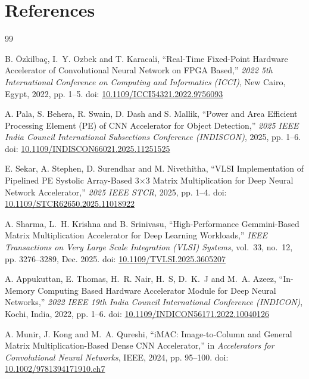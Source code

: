 \documentclass{article}
\begin{document}
\section*{References}

\begin{thebibliography}{99}


B. {\"O}zkilba{\c{c}}, I.~Y. Ozbek and T. Karacali,
``Real-Time Fixed-Point Hardware Accelerator of Convolutional Neural Network
on FPGA Based,''
\textit{2022 5th International Conference on Computing and Informatics (ICCI)},
New Cairo, Egypt, 2022, pp. 1--5.
doi: \href{https://doi.org/10.1109/ICCI54321.2022.9756093}
{10.1109/ICCI54321.2022.9756093}

A. Pala, S. Behera, R. Swain, D. Dash and S. Mallik,
``Power and Area Efficient Processing Element (PE) of CNN Accelerator
for Object Detection,''
\textit{2025 IEEE India Council International Subsections Conference (INDISCON)},
2025, pp. 1--6.
doi: \href{https://doi.org/10.1109/INDISCON66021.2025.11251525}
{10.1109/INDISCON66021.2025.11251525}

E. Sekar, A. Stephen, D. Surendhar and M. Nivethitha,
``VLSI Implementation of Pipelined PE Systolic Array-Based 3$\times$3 Matrix
Multiplication for Deep Neural Network Accelerator,''
\textit{2025 IEEE STCR}, 2025, pp. 1--4.
doi: \href{https://doi.org/10.1109/STCR62650.2025.11018922}
{10.1109/STCR62650.2025.11018922}

A. Sharma, L.~H. Krishna and B. Srinivasu,
``High-Performance Gemmini-Based Matrix Multiplication Accelerator for
Deep Learning Workloads,''
\textit{IEEE Transactions on Very Large Scale Integration (VLSI) Systems},
vol.~33, no.~12, pp. 3276--3289, Dec. 2025.
doi: \href{https://doi.org/10.1109/TVLSI.2025.3605207}
{10.1109/TVLSI.2025.3605207}

A. Appukuttan, E. Thomas, H.~R. Nair, H.~S, D.~K.~J and M.~A. Azeez,
``In-Memory Computing Based Hardware Accelerator Module for Deep Neural
Networks,''
\textit{2022 IEEE 19th India Council International Conference (INDICON)},
Kochi, India, 2022, pp. 1--6.
doi: \href{https://doi.org/10.1109/INDICON56171.2022.10040126}
{10.1109/INDICON56171.2022.10040126}

A. Munir, J. Kong and M.~A. Qureshi,
``iMAC: Image-to-Column and General Matrix Multiplication-Based Dense CNN
Accelerator,''
in \textit{Accelerators for Convolutional Neural Networks},
IEEE, 2024, pp. 95--100.
doi: \href{https://doi.org/10.1002/9781394171910.ch7}
{10.1002/9781394171910.ch7}


\end{thebibliography}
\end{document}
